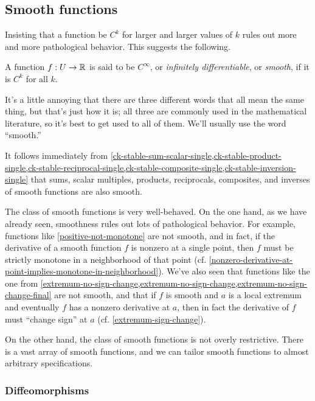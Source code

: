 \subsection{Smooth functions} \label{smooth-single}

Insisting that a function be $C^k$ for larger and larger values of $k$ rules out more and more pathological behavior. This suggests the following. 

\begin{definition}   
	A function $f : U \to \mathbb{R}$ is said to be $C^\infty$, or \emph{infinitely differentiable}, or \emph{smooth}, if it is $C^k$ for all $k$. 
\end{definition}

It's a little annoying that there are three different words that all mean the same thing, but that's just how it is; all three are commonly used in the mathematical literature, so it's best to get used to all of them. We'll usually use the word ``smooth.'' 

It follows immediately from \cref{ck-stable-sum-scalar-single,ck-stable-product-single,ck-stable-reciprocal-single,ck-stable-composite-single,ck-stable-inversion-single} that sums, scalar multiples, products, reciprocals, composites, and inverses of smooth functions are also smooth. 

The class of smooth functions is very well-behaved. On the one hand, as we have already seen, smoothness rules out lots of pathological behavior. For example, functions like \cref{positive-not-monotone} are not smooth, and in fact, if the derivative of a smooth function $f$ is nonzero at a single point, then $f$ must be strictly monotone in a neighborhood of that point (cf. \cref{nonzero-derivative-at-point-implies-monotone-in-neighborhood}). We've also seen that functions like the one from \cref{extremum-no-sign-change,extremum-no-sign-change,extremum-no-sign-change-final} are not smooth, and that if $f$ is smooth and $a$ is a local extremum and eventually $f$ has a nonzero derivative at $a$, then in fact the derivative of $f$ must ``change sign'' at $a$ (cf. \cref{extremum-sign-change}). 

On the other hand, the class of smooth functions is not overly restrictive. There is a vast array of smooth functions, and we can tailor smooth functions to almost arbitrary specifications. 

\subsubsection*{Diffeomorphisms}

